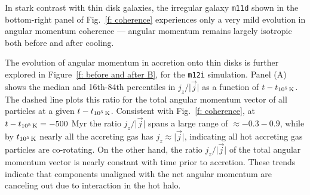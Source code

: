 \documentclass[fleqn,usenatbib]{mnras}
\newcommand{\tcon}{t_{10^5\,{\rm K}}}
\begin{document}
In stark contrast with thin disk galaxies, the irregular galaxy \texttt{m11d} shown in the bottom-right panel of Fig.~\ref{f: coherence} experiences only a very mild evolution in angular momentum coherence --- angular momentum remains largely isotropic both before and after cooling.




The evolution of angular momentum in accretion onto thin disks is further explored in Figure~\ref{f: before and after B}, for the \texttt{m12i} simulation.
Panel (A) shows the median and 16th-84th percentiles in $j_z/\vert\vec j\vert$ as a function of $t-\tcon$.
The dashed line plots this ratio for the total angular momentum vector of all particles at a given $t-\tcon$. 
Consistent with Fig.~\ref{f: coherence}, at $t-\tcon=-500$ Myr the ratio $j_z/\vert\vec j\vert$ spans a large range of $\approx -0.3 - 0.9$, while by $\tcon$ nearly all the accreting gas has $j_z\approx\vert\vec j\vert$, indicating all hot accreting gas particles are co-rotating.
On the other hand, the ratio $j_z/\vert\vec j\vert$ of the total angular momentum vector is nearly constant with time prior to accretion. 
These trends indicate that components unaligned with the net angular momentum are canceling out due to interaction in the hot halo.
\end{document}
